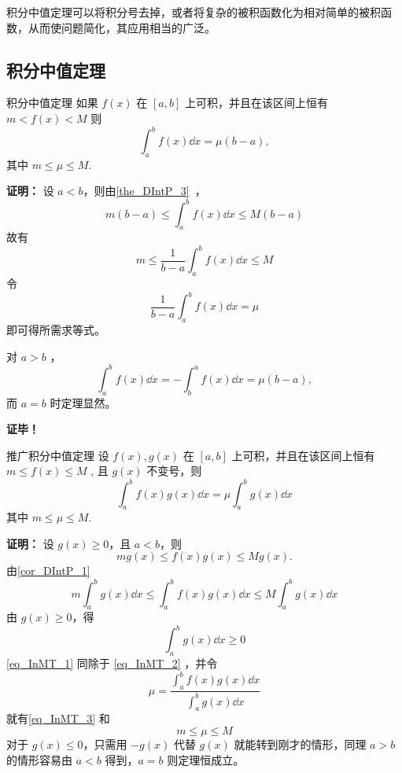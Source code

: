 
积分中值定理可以将积分号去掉，或者将复杂的被积函数化为相对简单的被积函数，从而使问题简化，其应用相当的广泛。

\subsection{积分中值定理}
\begin{theorem}{积分中值定理}
如果 $f(x)$ 在 $[a,b]$ 上可积，并且在该区间上恒有$m<f(x)<M$
则
\begin{equation}
\int_a^b f(x)\dd x=\mu(b-a),
\end{equation}
其中 $m\leq\mu\leq M.$
\end{theorem}

\textbf{证明：}
设 $a<b$，则由\autoref{the_DIntP_3}~，
\begin{equation}
m(b-a)\leq\int_a^b f(x)\dd x\leq M(b-a)
\end{equation}
故有
\begin{equation}
m\leq\frac{1}{b-a}\int_a^b f(x)\dd x\leq M
\end{equation}
令
\begin{equation}
\frac{1}{b-a}\int_a^b f(x)\dd x=\mu
\end{equation}
即可得所需求等式。

对 $a>b$ ，
\begin{equation}
\int_a^b f(x)\dd x=-\int_b^a f(x)\dd x=\mu(b-a),
\end{equation}
而 $a=b$ 时定理显然。 

\textbf{证毕！}

\begin{theorem}{推广积分中值定理}\label{the_InMT_1}
设 $f(x),g(x)$ 在 $[a,b]$ 上可积，并且在该区间上恒有$m\leq f(x)\leq M$
, 且 $g(x)$ 不变号，则
\begin{equation}\label{eq_InMT_3}
\int_a^b f(x)g(x)\dd x=\mu\int_a^b g(x)\dd x
\end{equation}
其中 $m\leq\mu\leq M.$
\end{theorem}
\textbf{证明：}
设 $g(x)\geq 0$，且 $a<b$，则
\begin{equation}
mg(x)\leq f(x)g(x)\leq Mg(x).
\end{equation}
由\autoref{cor_DIntP_1}~
\begin{equation}\label{eq_InMT_1}
m\int_a^b g(x)\dd x\leq\int_a^b f(x)g(x)\dd x\leq M\int_a^b g(x)\dd x
\end{equation}
由 $g(x)\geq0$，得
\begin{equation}\label{eq_InMT_2}
\int_a^b g(x)\dd x\geq0
\end{equation}
\autoref{eq_InMT_1} 同除于 \autoref{eq_InMT_2} ，并令
\begin{equation}
\mu=\frac{\int_a^b f(x)g(x)\dd x}{\int_a^b g(x)\dd x}
\end{equation}
就有\autoref{eq_InMT_3} 和
\begin{equation}
m\leq\mu\leq M
\end{equation}
对于 $g(x)\leq0$，只需用 $-g(x)$ 代替 $g(x)$ 就能转到刚才的情形，同理 $a>b$ 的情形容易由 $a<b$ 得到，$a=b$ 则定理恒成立。

